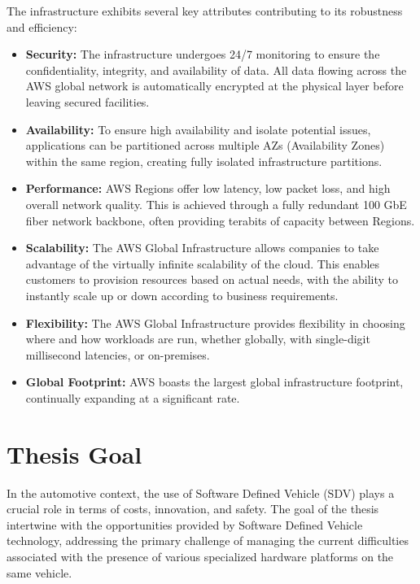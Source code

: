 The infrastructure exhibits several key attributes contributing to its robustness and efficiency: 
\begin{itemize} 
  \item \textbf{Security:} The infrastructure undergoes 24/7 monitoring to ensure the confidentiality, integrity, and availability of data. All data flowing across the AWS global network is automatically encrypted at the physical layer before leaving secured facilities.
  \item \textbf{Availability:} To ensure high availability and isolate potential issues, applications can be partitioned across multiple AZs (Availability Zones) within the same region, creating fully isolated infrastructure partitions.
  \item \textbf{Performance:} AWS Regions offer low latency, low packet loss, and high overall network quality. This is achieved through a fully redundant 100 GbE fiber network backbone, often providing terabits of capacity between Regions.
  \item \textbf{Scalability:} The AWS Global Infrastructure allows companies to take advantage of the virtually infinite scalability of the cloud. This enables customers to provision resources based on actual needs, with the ability to instantly scale up or down according to business requirements.
  \item \textbf{Flexibility:} The AWS Global Infrastructure provides flexibility in choosing where and how workloads are run, whether globally, with single-digit millisecond latencies, or on-premises.
  \item \textbf{Global Footprint:} AWS boasts the largest global infrastructure footprint, continually expanding at a significant rate.
\end{itemize}

\section{Thesis Goal}
In the automotive context, the use of Software Defined Vehicle (SDV) plays a crucial role in terms of costs, innovation, and safety. The goal of the thesis intertwine with the opportunities provided by Software Defined Vehicle technology, addressing the primary challenge of managing the current difficulties associated with the presence of various specialized hardware platforms on the same vehicle.

